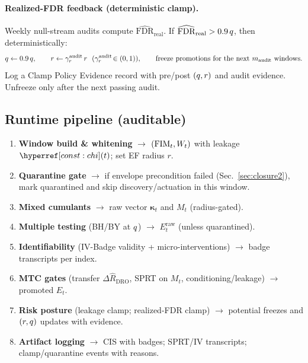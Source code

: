 \paragraph{Realized-FDR feedback (deterministic clamp).}\label{par:fdr-feedback}
Weekly null-stream audits compute $\widehat{\mathrm{FDR}}_{\text{real}}$. If $\widehat{\mathrm{FDR}}_{\text{real}}>0.9\,q$, then deterministically:
\[
\cutq \leftarrow 0.9\,\cutq,\qquad r \leftarrow \gamma_r^{\mathrm{audit}}\, r\ \ (\gamma_r^{\mathrm{audit}}\!\in(0,1)),\qquad
\text{freeze promotions for the next $m_{\mathrm{audit}}$ windows.}
\]
Log a \textsf{Clamp Policy Evidence} record with pre/post $(q,r)$ and audit evidence. Unfreeze only after the next passing audit.

\subsection*{Runtime pipeline (auditable)}
\begin{enumerate}[leftmargin=*,itemsep=2pt]
\item \textbf{Window build \& whitening} $\to$ $(\mathrm{FIM}_t,W_t)$ with leakage $\constref{chi}(t)$; set EF radius $r$.
\item \textbf{Quarantine gate} $\to$ if envelope precondition failed (Sec.~\ref{sec:closure2}), mark \textsf{quarantined} and skip discovery/actuation in this window.
\item \textbf{Mixed cumulants} $\to$ raw vector $\bm\kappa_t$ and $M_t$ (radius-gated).
\item \textbf{Multiple testing} (BH/BY at $q$) $\to$ $E_t^{\mathrm{raw}}$ (unless quarantined).
\item \textbf{Identifiability} (IV-Badge validity + micro-interventions) $\to$ badge transcripts per index.
\item \textbf{MTC gates} (transfer $\Delta\hat R_{\mathrm{DRO}}$, SPRT on $M_t$, conditioning/leakage) $\to$ promoted $E_t$.
\item \textbf{Risk posture} (leakage clamp; realized-FDR clamp) $\to$ potential freezes and $(r,q)$ updates with evidence.
\item \textbf{Artifact logging} $\to$ CIS with badges; SPRT/IV transcripts; clamp/quarantine events with reasons.
\end{enumerate}

